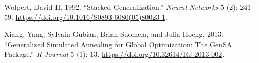 \begin{CSLReferences}{1}{0}
\leavevmode{}%
Wolpert, David H. 1992. {``Stacked Generalization.''} \emph{Neural
Networks} 5 (2): 241--59.
\url{https://doi.org/10.1016/S0893-6080(05)80023-1}.

\leavevmode{}%
Xiang, Yang, Sylvain Gubian, Brian Suomela, and Julia Hoeng. 2013.
{``Generalized Simulated Annealing for Global Optimization: The GenSA
Package.''} \emph{{R} Journal} 5 (1): 13.
\url{https://doi.org/10.32614/RJ-2013-002}.

\end{CSLReferences}